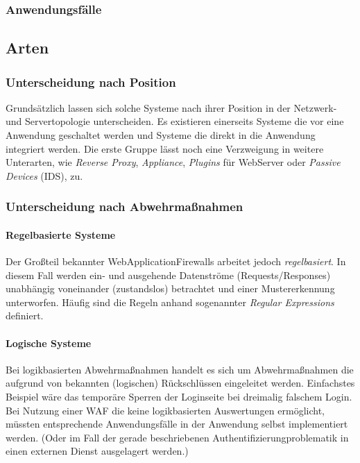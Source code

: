 \subsubsection{Anwendungsfälle}

\subsection{Arten}

\subsubsection{Unterscheidung nach Position}
Grundsätzlich lassen sich solche Systeme nach ihrer Position in der Netzwerk- und Servertopologie unterscheiden. Es existieren einerseits Systeme die vor eine Anwendung geschaltet werden und Systeme die direkt in die Anwendung integriert werden. Die erste Gruppe lässt noch eine Verzweigung in weitere Unterarten, wie \emph{Reverse Proxy}, \emph{Appliance}, \emph{Plugins} für WebServer oder \emph{Passive Devices} (IDS), zu.


\subsubsection{Unterscheidung nach Abwehrmaßnahmen}

\paragraph{Regelbasierte Systeme}
Der Großteil bekannter WebApplicationFirewalls arbeitet jedoch \emph{regelbasiert}. In diesem Fall werden ein- und ausgehende Datenströme (Requests/Responses) unabhängig voneinander (zustandslos) betrachtet und einer Mustererkennung unterworfen. Häufig sind die Regeln anhand sogenannter \emph{Regular Expressions} definiert.

\paragraph{Logische Systeme}
Bei logikbasierten Abwehrmaßnahmen handelt es sich um Abwehrmaßnahmen die aufgrund von bekannten (logischen) Rückschlüssen eingeleitet werden. Einfachstes Beispiel wäre das temporäre Sperren der Loginseite bei dreimalig falschem Login. Bei Nutzung einer WAF die keine logikbasierten Auswertungen ermöglicht, müssten entsprechende Anwendungsfälle in der Anwendung selbst implementiert werden. (Oder im Fall der gerade beschriebenen Authentifizierungproblematik in einen externen Dienst ausgelagert werden.)

